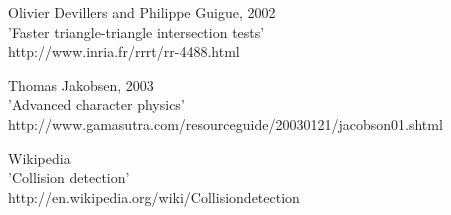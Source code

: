 \begin{thebibliography}{99}

Olivier Devillers and Philippe Guigue, 2002\\
'Faster triangle-triangle intersection tests'\\
http://www.inria.fr/rrrt/rr-4488.html

Thomas Jakobsen, 2003\\
'Advanced character physics'\\
http://www.gamasutra.com/resource\textunderscore guide/20030121/jacobson\textunderscore 01.shtml

Wikipedia\\
'Collision detection'\\
http://en.wikipedia.org/wiki/Collision\textunderscore detection

\end{thebibliography}